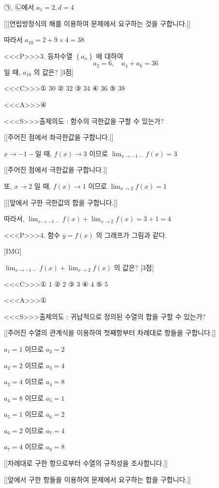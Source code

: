 \documentclass{oblivoir}
\begin{document}
㉠, ㉡에서
$a_{1}=2, d=4$

[[[연립방정식의 해를 이용하여 문제에서 요구하는 것을 구합니다.]]

따라서
$a_{10}=2+9 \times 4=38$

<<<P>>>3. 등차수열 $\left\{a_{n}\right\}$ 에 대하여
$$
a_{2}=6, \quad a_{4}+a_{6}=36
$$
일 때, $a_{10}$ 의 값은? [3점]

<<<C>>>① $30$
② $32$
③ $34$
④ $36$
⑤ $38$

<<<A>>>④

<<<S>>>출제의도 : 함수의 극한값을 구할 수 있는가?

[[주어진 점에서 좌극한값을 구합니다.]]

$x \rightarrow-1-$일 때, $f(x) \rightarrow 3$ 이므로 $\displaystyle\lim _{x \rightarrow-1-} f(x)=3$

[[주어진 점에서 극한값을 구합니다.]]

또, $x \rightarrow 2$ 일 때, $f(x) \rightarrow 1$ 이므로 $\displaystyle\lim _{x \rightarrow 2} f(x)=1$

[[[앞에서 구한 극한값의 합을 구합니다.]]

따라서,
$\displaystyle\lim _{x \rightarrow-1-} f(x)+\displaystyle\lim _{x \rightarrow 2} f(x)=3+1=4$

<<<P>>>4. 함수 $y=f(x)$ 의 그래프가 그림과 같다.

[IMG]

$\displaystyle\lim _{x \rightarrow-1-} f(x)+\displaystyle\lim _{x \rightarrow 2} f(x)$ 의 값은? [3점]

<<<C>>>① $1$
② $2$
③ $3$
④ $4$
⑤ $5$

<<<A>>>①

<<<S>>>출제의도 : 귀납적으로 정의된 수열의 합을 구할 수 있는가?


[[주어진 수열의 관계식을 이용하여 첫째항부터 차례대로 항들을 구합니다.]]

$a_{1}=1$ 이므로 $a_{2}=2$

$a_{2}=2$ 이므로 $a_{3}=4$

$a_{3}=4$ 이므로 $a_{4}=8$

$a_{4}=8$ 이므로 $a_{5}=1$

$a_{5}=1$ 이므로 $a_{6}=2$

$a_{6}=2$ 이므로 $a_{7}=4$

$a_{7}=4$ 이므로 $a_{8}=8$

[[차례대로 구한 항으로부터 수열의 규칙성을 조사합니다.]]

[[앞에서 구한 항들을 이용하여 문제에서 요구하는 합을 구합니다.]]
\end{document}
